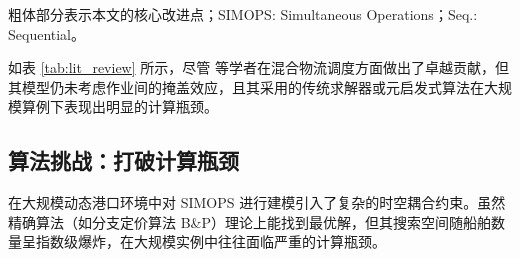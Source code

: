 \documentclass[UTF8, a4paper, 12pt]{ctexart}
\begin{document}
\begin{table}[htbp]
    \centering
    \caption{本文与现有相关研究的特征对比分析}
    \label{tab:lit_review}
    \footnotesize 
    \renewcommand{\arraystretch}{1.4} %
    \begin{threeparttable}
        \begin{tablenotes}
            \item[注] 粗体部分表示本文的核心改进点；SIMOPS: Simultaneous Operations；Seq.: Sequential。
        \end{tablenotes}
    \end{threeparttable}
\end{table}

如表 \ref{tab:lit_review} 所示，尽管 \cite{Hong2025} 等学者在混合物流调度方面做出了卓越贡献，但其模型仍未考虑作业间的掩盖效应，且其采用的传统求解器或元启发式算法在大规模算例下表现出明显的计算瓶颈。

\subsection{算法挑战：打破计算瓶颈}
在大规模动态港口环境中对 SIMOPS 进行建模引入了复杂的时空耦合约束。虽然精确算法（如分支定价算法 B\&P）理论上能找到最优解，但其搜索空间随船舶数量呈指数级爆炸，在大规模实例中往往面临严重的计算瓶颈。
\end{document}
